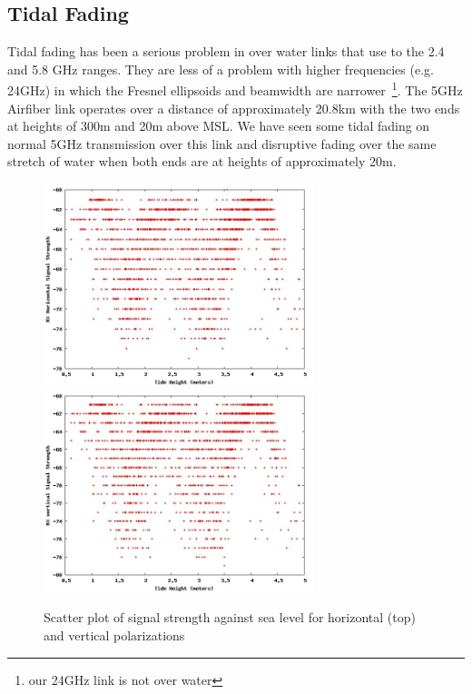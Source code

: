 \subsection{Tidal Fading}
Tidal fading has been a serious problem in over water links that 
use to the 2.4 and 5.8 GHz ranges.  They are less of a problem with
higher frequencies (e.g. 24GHz) in which the Fresnel ellipsoids and
beamwidth are narrower~\footnote{our 24GHz link is not over
  water}. The 5GHz Airfiber link operates over a distance of
approximately  20.8km with the two ends at heights of 300m and 20m
above MSL.  We have seen some tidal fading on normal 5GHz transmission
over this link and disruptive fading over the same stretch of water
when both ends are at heights of approximately 20m.

\begin{figure}
\includegraphics[width=0.7\textwidth]{tidedata/rxpower0.jpg}
\includegraphics[width=0.7\textwidth]{tidedata/rxpower1.jpg}
\caption{Scatter plot of signal strength against sea level for
  horizontal (top) and vertical  polarizations}
\label{fig:rxpower}
\end{figure}

